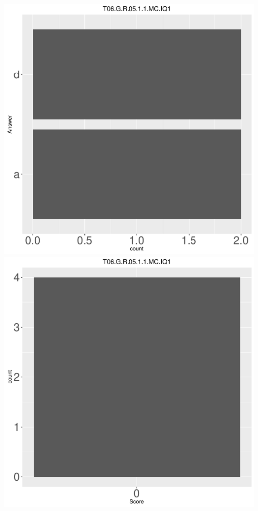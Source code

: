 \documentclass[12pt,english,nohyper]{tufte-handout}\usepackage[]{graphicx}\usepackage[]{color}
\begin{document}
\begin{center} \includegraphics[width=.45\linewidth]{Topic06_AB_72_answer} \includegraphics[width=.45\linewidth]{Topic06_AB_72_score} \end{center} 
\end{document}

